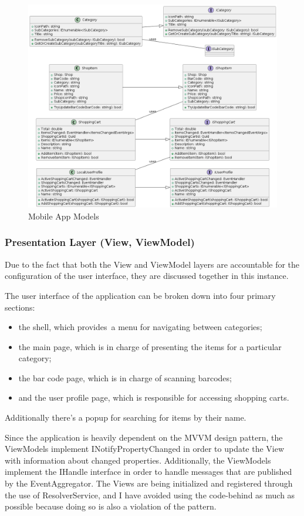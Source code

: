 \begin{figure}[H]
	\centering
	\includegraphics[width=1\linewidth]{img/app_models.png}
	\caption{Mobile App Models}
	\label{fig:appmodels}
\end{figure}

\subsubsection{Presentation Layer (View, ViewModel)}

Due to the fact that both the View and ViewModel layers are accountable for the configuration of the user interface, they are discussed together in this instance. 

The user interface of the application can be broken down into four primary sections: \begin{itemize}
	\item the shell, which provides a menu for navigating between categories;
	\item the main page, which is in charge of presenting the items for a particular category;
	\item the bar code page, which is in charge of scanning barcodes;
	\item  and the user profile page, which is responsible for accessing shopping carts.
\end{itemize} 
Additionally there's a popup for searching for items by their name.

Since the application is heavily dependent on the MVVM design pattern, the ViewModels implement INotifyPropertyChanged in order to update the View with information about changed properties. Additionally, the ViewModels implement the IHandle interface in order to handle messages that are published by the EventAggregator. The Views are being initialized and registered through the use of ResolverService, and I have avoided using the code-behind as much as possible because doing so is also a violation of the pattern.

